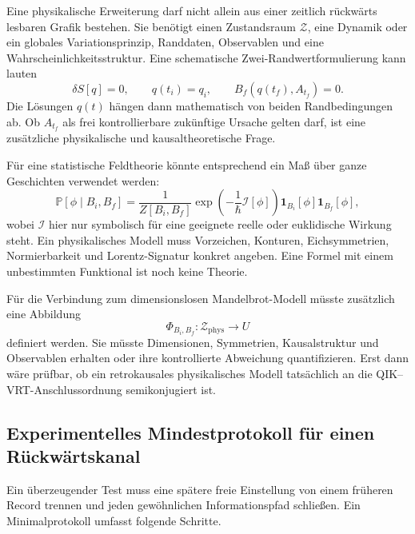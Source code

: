 \documentclass[11pt,a4paper]{article}
\theoremstyle{remark}
\begin{document}
Eine physikalische Erweiterung darf nicht allein aus einer zeitlich
rückwärts lesbaren Grafik bestehen. Sie benötigt einen Zustandsraum
\(\mathcal Z\), eine Dynamik oder ein globales Variationsprinzip, Randdaten,
Observablen und eine Wahrscheinlichkeitsstruktur. Eine schematische
Zwei-Randwertformulierung kann lauten
\begin{equation}
\label{eq:two-boundary}
  \delta S[q]=0,
  \qquad
  q(t_i)=q_i,
  \qquad
  B_f(q(t_f),A_{t_f})=0.
\end{equation}
Die Lösungen \(q(t)\) hängen dann mathematisch von beiden Randbedingungen ab.
Ob \(A_{t_f}\) als frei kontrollierbare zukünftige Ursache gelten darf, ist
eine zusätzliche physikalische und kausaltheoretische Frage.

Für eine statistische Feldtheorie könnte entsprechend ein Maß über ganze
Geschichten verwendet werden:
\begin{equation}
\label{eq:path-retro}
  \mathbb P[\phi\mid B_i,B_f]
  =\frac{1}{Z[B_i,B_f]}
  \exp\!\left(-\frac{1}{\hbar}\mathcal I[\phi]\right)
  \mathbf 1_{B_i}[\phi]\mathbf 1_{B_f}[\phi],
\end{equation}
wobei \(\mathcal I\) hier nur symbolisch für eine geeignete reelle oder
euklidische Wirkung steht. Ein physikalisches Modell muss Vorzeichen,
Konturen, Eichsymmetrien, Normierbarkeit und Lorentz-Signatur konkret
angeben. Eine Formel mit einem unbestimmten Funktional ist noch keine Theorie.

Für die Verbindung zum dimensionslosen Mandelbrot-Modell müsste zusätzlich
eine Abbildung
\[
  \Phi_{B_i,B_f}:\mathcal Z_{\mathrm{phys}}\longrightarrow U
\]
definiert werden. Sie müsste Dimensionen, Symmetrien, Kausalstruktur und
Observablen erhalten oder ihre kontrollierte Abweichung quantifizieren. Erst
dann wäre prüfbar, ob ein retrokausales physikalisches Modell tatsächlich an
die QIK--VRT-Anschlussordnung semikonjugiert ist.

\subsection{Experimentelles Mindestprotokoll für einen Rückwärtskanal}
\label{sec:retro-protokoll}

Ein überzeugender Test muss eine spätere freie Einstellung von einem früheren
Record trennen und jeden gewöhnlichen Informationspfad schließen. Ein
Minimalprotokoll umfasst folgende Schritte.
\end{document}
